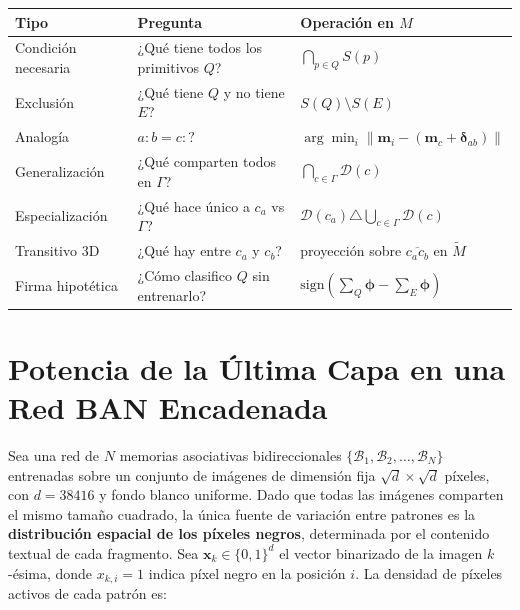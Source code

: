 \documentclass[12pt]{article}
\begin{document}
\begin{center}
	\begin{tabular}{p{3.2cm} p{4.5cm} p{4.5cm}}
		\toprule
		\textbf{Tipo} & \textbf{Pregunta} & \textbf{Operación en $M$} \\
		\midrule
		Condición necesaria
		& ¿Qué tiene todos los primitivos $Q$?
		& $\bigcap_{p \in Q} S(p)$ \\[6pt]
		Exclusión
		& ¿Qué tiene $Q$ y no tiene $E$?
		& $S(Q) \setminus S(E)$ \\[6pt]
		Analogía
		& $a:b = c:?$
		& $\arg\min_i \|\mathbf{m}_i - (\mathbf{m}_c + \bm{\delta}_{ab})\|$ \\[6pt]
		Generalización
		& ¿Qué comparten todos en $\Gamma$?
		& $\bigcap_{c \in \Gamma} \mathcal{D}(c)$ \\[6pt]
		Especialización
		& ¿Qué hace único a $c_a$ vs $\Gamma$?
		& $\mathcal{D}(c_a) \triangle \bigcup_{c \in \Gamma}\mathcal{D}(c)$ \\[6pt]
		Transitivo 3D
		& ¿Qué hay entre $c_a$ y $c_b$?
		& proyección sobre $\overline{c_a c_b}$ en $\tilde{M}$ \\[6pt]
		Firma hipotética
		& ¿Cómo clasifico $Q$ sin entrenarlo?
		& $\mathrm{sign}(\sum_{Q}\bm{\phi} - \sum_{E}\bm{\phi})$ \\
		\bottomrule
	\end{tabular}
\end{center}

































\section*{Potencia de la Última Capa en una Red BAN Encadenada}

Sea una red de $N$ memorias asociativas bidireccionales $\{\mathcal{B}_1, \mathcal{B}_2, \dots, \mathcal{B}_N\}$
entrenadas sobre un conjunto de imágenes de dimensión fija $\sqrt{d} \times \sqrt{d}$ píxeles,
con $d = 38416$ y fondo blanco uniforme. Dado que todas las imágenes comparten el mismo tamaño
cuadrado, la única fuente de variación entre patrones es la \textbf{distribución espacial de los
	píxeles negros}, determinada por el contenido textual de cada fragmento. Sea $\mathbf{x}_k \in \{0,1\}^{d}$
el vector binarizado de la imagen $k$-ésima, donde $x_{k,i} = 1$ indica píxel negro en la posición $i$.
La densidad de píxeles activos de cada patrón es:
\end{document}
